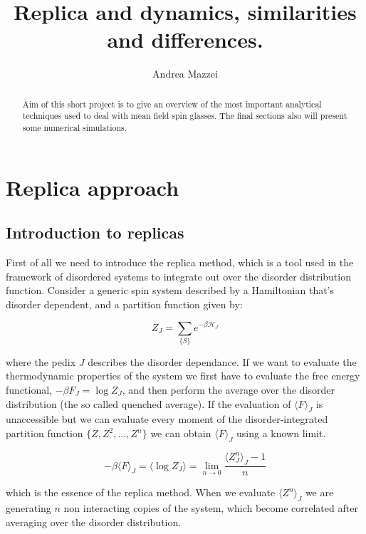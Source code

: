 \documentclass{article}
\begin{document}
\title{Replica and dynamics, similarities and differences.}
\author{Andrea Mazzei }
\maketitle

\begin{abstract}
Aim of this short project is to give an overview of the most important analytical techniques used to deal with mean field spin glasses. The final sections also will present some numerical simulations.
\end{abstract}

\section{Replica approach}\label{prelim}

\subsection{Introduction to replicas}

First of all we need to introduce the replica method, which is a tool used in
the framework of disordered systems to integrate out over the disorder
distribution function. Consider a generic spin system described by a
Hamiltonian that's disorder dependent, and a partition function given by:

\begin{equation}
  Z_J = \sum_{\{S\}} e^{- \beta \mathcal{H}_J}
\end{equation}

where the pedix $J$ describes the disorder dependance. If we want to evaluate
the thermodynamic properties of the system we first have to evaluate the free
energy functional, $- \beta F_J = \log Z_J$, and then perform the average over
the disorder distribution (the so called quenched average). If the evaluation
of $\langle F \rangle_J$ is unaccessible but we can evaluate every moment of
the disorder-integrated partition function $\{Z, Z^2, \ldots, Z^n \}$ we can
obtain $\langle F \rangle_J$ using a known limit.

\begin{equation}
  - \beta \langle F \rangle_J = \langle \log Z_J \rangle = \lim_{n \rightarrow
  0}  \frac{\langle Z_J^n \rangle_J - 1}{n}
\end{equation}

which is the essence of the replica method. When we evaluate $\langle Z^n
\rangle_J$ we are generating $n$ non interacting copies of the system, which
become correlated after averaging over the disorder distribution.
\end{document}
